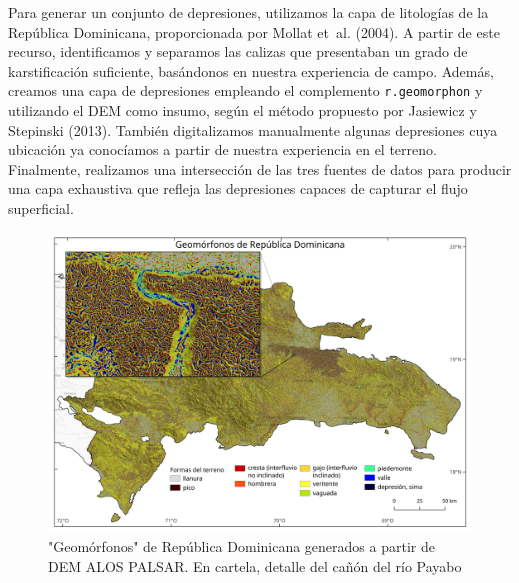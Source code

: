 \documentclass[spanish]{article}
\begin{document}
Para generar un conjunto de depresiones, utilizamos la capa de
litologías de la República Dominicana, proporcionada por Mollat et~al.
(2004). A partir de este recurso, identificamos y separamos las calizas
que presentaban un grado de karstificación suficiente, basándonos en
nuestra experiencia de campo. Además, creamos una capa de depresiones
empleando el complemento \texttt{r.geomorphon} y utilizando el DEM como
insumo, según el método propuesto por Jasiewicz y Stepinski (2013).
También digitalizamos manualmente algunas depresiones cuya ubicación ya
conocíamos a partir de nuestra experiencia en el terreno. Finalmente,
realizamos una intersección de las tres fuentes de datos para producir
una capa exhaustiva que refleja las depresiones capaces de capturar el
flujo superficial.

\begin{figure}

{\centering \includegraphics[width=1\linewidth]{figuras/geomorfonos-de-rd} 

}

\caption{"Geomórfonos" de República Dominicana generados a partir de DEM ALOS PALSAR. En cartela, detalle del cañón del río Payabo}\label{fig:geomorfonosrd}
\end{figure}
\end{document}
